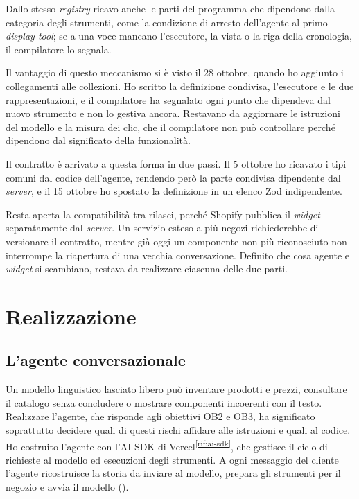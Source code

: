 Dallo stesso \emph{registry} ricavo anche le parti del programma che dipendono dalla categoria
degli strumenti, come la condizione di arresto dell’agente al primo \emph{display tool}; se a una
voce mancano l’esecutore, la vista o la riga della cronologia, il compilatore
lo segnala.

Il vantaggio di questo meccanismo si è visto il 28 ottobre, quando ho aggiunto i collegamenti alle
collezioni. Ho scritto la definizione condivisa, l’esecutore e le due rappresentazioni, e il
compilatore ha segnalato ogni punto che dipendeva dal nuovo strumento e non lo gestiva ancora.
Restavano da aggiornare le istruzioni del modello e la misura dei clic, che il compilatore non può
controllare perché dipendono dal significato della funzionalità.

Il contratto è arrivato a questa forma in due passi. Il 5 ottobre ho ricavato i tipi comuni dal codice
dell’agente, rendendo però la parte condivisa dipendente dal \emph{server}, e il 15 ottobre ho
spostato la definizione in un elenco Zod indipendente.

Resta aperta la compatibilità tra rilasci, perché Shopify pubblica il \emph{widget} separatamente
dal \emph{server}. Un servizio esteso a più negozi richiederebbe di versionare il contratto, mentre
già oggi un componente non più riconosciuto non interrompe la riapertura di una vecchia
conversazione. Definito che cosa
agente e \emph{widget} si scambiano, restava da realizzare ciascuna delle due parti.

\section{Realizzazione}

\subsection{L’agente conversazionale}
\label{sec:agente}

Un modello linguistico lasciato libero può inventare prodotti e prezzi, consultare il catalogo
senza concludere o mostrare componenti incoerenti con il testo. Realizzare l’agente, che risponde
agli obiettivi OB2 e OB3, ha significato soprattutto decidere quali di questi rischi affidare alle
istruzioni e quali al codice. Ho costruito l’agente con l’AI SDK di
Vercel\textsuperscript{\ref{rif:ai-sdk}}, che gestisce il ciclo di richieste al modello ed
esecuzioni degli strumenti. A ogni messaggio del cliente l’agente ricostruisce la storia da inviare
al modello, prepara gli
strumenti per il negozio e avvia il modello ().


